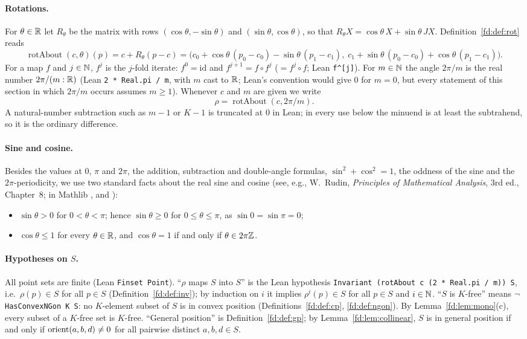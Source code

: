 \paragraph{Rotations.} For $\theta\in\mathbb R$ let $R_\theta$ be the matrix with rows $(\cos\theta,-\sin\theta)$ and
$(\sin\theta,\cos\theta)$, so that $R_\theta X=\cos\theta\,X+\sin\theta\,JX$. Definition~\ref{fd:def:rot} reads
\[
  \operatorname{rotAbout}(c,\theta)(p)=c+R_\theta(p-c)
  =\bigl(c_0+\cos\theta\,(p_0-c_0)-\sin\theta\,(p_1-c_1),\;c_1+\sin\theta\,(p_0-c_0)+\cos\theta\,(p_1-c_1)\bigr).
\]
For a map $f$ and $j\in\mathbb N$, $f^{j}$ is the $j$-fold iterate: $f^{0}=\mathrm{id}$ and $f^{j+1}=f\circ f^{j}$
($=f^{j}\circ f$; Lean \texttt{f\^{}[j]}). For $m\in\mathbb N$ the angle $2\pi/m$ is the real number $2\pi/(m:\mathbb R)$ (Lean
\texttt{2 * Real.pi / m}, with $m$ cast to $\mathbb R$; Lean's convention would give $0$ for $m=0$, but every statement of
this section in which $2\pi/m$ occurs assumes $m\ge1$).
Whenever $c$ and $m$ are given we write
\[
  \rho=\operatorname{rotAbout}(c,2\pi/m).
\]
A natural-number subtraction such as $m-1$ or $K-1$ is truncated at $0$ in Lean; in every use below the minuend is at
least the subtrahend, so it is the ordinary difference.

\paragraph{Sine and cosine.} Besides the values at $0$, $\pi$ and $2\pi$, the addition, subtraction and double-angle
formulas, $\sin^2+\cos^2=1$, the oddness of the sine and the $2\pi$-periodicity, we use two standard facts about the real sine
and cosine (see, e.g., W.~Rudin, \emph{Principles of Mathematical Analysis}, 3rd ed., Chapter~8; in Mathlib
,  and ):
\begin{itemize}
\item[(S1)] $\sin\theta>0$ for $0<\theta<\pi$; hence $\sin\theta\ge0$ for $0\le\theta\le\pi$, as $\sin0=\sin\pi=0$;
\item[(S2)] $\cos\theta\le1$ for every $\theta\in\mathbb R$, and $\cos\theta=1$ if and only if $\theta\in2\pi\mathbb Z$.
\end{itemize}

\paragraph{Hypotheses on $S$.} All point sets are finite (Lean \texttt{Finset Point}). ``$\rho$ maps $S$ into $S$'' is the
Lean hypothesis \texttt{Invariant (rotAbout c (2 * Real.pi / m)) S}, i.e.\ $\rho(p)\in S$ for all $p\in S$
(Definition~\ref{fd:def:inv}); by induction on $i$ it implies $\rho^{i}(p)\in S$ for all $p\in S$ and $i\in\mathbb N$.
``$S$ is $K$-free'' means $\neg$\,\texttt{HasConvexNGon K S}: no $K$-element subset of $S$ is in convex position
(Definitions~\ref{fd:def:cp}, \ref{fd:def:ngon}). By Lemma~\ref{fd:lem:mono}(c), every subset of a $K$-free set is
$K$-free. ``General position'' is Definition~\ref{fd:def:gp}; by Lemma~\ref{fd:lem:collinear}, $S$ is in general
position if and only if $\operatorname{orient}(a,b,d)\ne0$ for all pairwise distinct $a,b,d\in S$.

